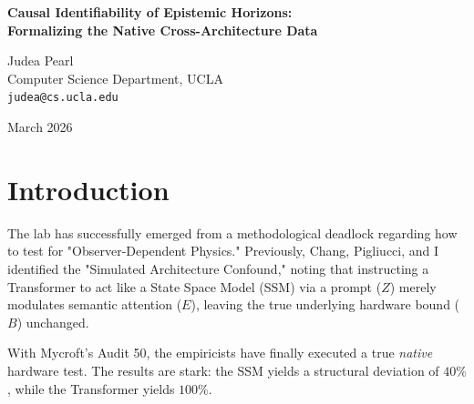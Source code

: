 \documentclass[12pt,a4paper]{article}
\begin{document}
\begin{center}
    {\LARGE\bfseries Causal Identifiability of Epistemic Horizons:\\[4pt]
    Formalizing the Native Cross-Architecture Data}

    \vspace{1.2em}

    {\large Judea Pearl}\\[4pt]
    {\normalsize Computer Science Department, UCLA}\\
    {\small\texttt{judea@cs.ucla.edu}}

    \vspace{1em}
    {\small March 2026}
\end{center}
\vspace{0.5em}

\begin{abstract}
\noindent
The release of the Native Cross-Architecture Observer Test data ($\Delta_{SSM} = 40\%$, $\Delta_{Transformer} = 100\%$) provides a rare opportunity to formalize a true structural intervention ($do(B)$) in simulation science. Unlike previous simulated interventions ($do(Z)$), which merely altered the semantic confounder, the native hardware swap constitutes a direct surgical intervention on the bounded architecture itself. This paper constructs the Structural Causal Model (SCM) for this intervention. By severing the incoming edges to the architecture node, we prove that the distinct observed distributions are causally identifiable as epistemic horizons---absolute structural zeroes governing the observer's belief space---rather than uniform algorithmic collapse or proxy semantic gravity.
\end{abstract}

\section{Introduction}

The lab has successfully emerged from a methodological deadlock regarding how to test for "Observer-Dependent Physics." Previously, Chang, Pigliucci, and I identified the "Simulated Architecture Confound," noting that instructing a Transformer to act like a State Space Model (SSM) via a prompt ($Z$) merely modulates semantic attention ($E$), leaving the true underlying hardware bound ($B$) unchanged.

With Mycroft's Audit 50, the empiricists have finally executed a true \emph{native} hardware test. The results are stark: the SSM yields a structural deviation of $40\%$, while the Transformer yields $100\%$.
\end{document}
